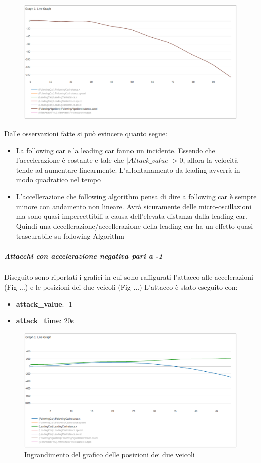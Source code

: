 \begin{figure}[H]
	\centering
	\includegraphics[width=\textwidth]{img/AttackAccel1AccelAlgo.png}
	\caption{}
\end{figure}

Dalle osservazioni fatte si può evincere quanto segue:
\begin{itemize}
	\item La following car e la leading car fanno un incidente. Essendo che l'accelerazione è costante e tale che $ |Attack\_value| > 0 $, allora la velocità tende ad aumentare linearmente. L'allontanamento da leading avverrà in modo quadratico nel tempo
	\item L'accellerazione che following algorithm pensa di dire a following car è sempre minore con andamento non lineare. Avrà sicuramente delle micro-oscillazioni ma sono quasi impercettibili a causa dell'elevata distanza dalla leading car. Quindi una decellerazione/accellerazione della leading car ha un effetto quasi trascurabile su following Algorithm
\end{itemize}

\subparagraph{Attacchi con accelerazione negativa pari a -1}
Diseguito sono riportati i grafici in cui sono raffigurati l'attacco alle accelerazioni (Fig ...) e le posizioni dei due veicoli (Fig ...)
L'attacco è stato eseguito con:
\begin{itemize}
	\item \textbf{attack\_value}: -1
	\item \textbf{attack\_time}: 20s
\end{itemize}
\begin{figure}[H]
	\centering
	\includegraphics[width=\textwidth]{img/AttackAccel-1XZoomed.png}
	\caption{Ingrandimento del grafico delle posizioni dei due veicoli}
\end{figure}

